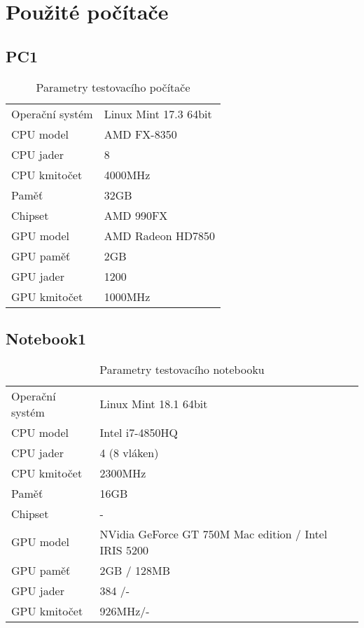 \section{Použité počítače}

\subsection{PC1}

\begin{table}[htbp]
\centering
\caption{Parametry testovacího počítače}
\begin{tabular}{|l|l|}
\hline
Operační systém&Linux Mint 17.3 64bit\\
CPU model&AMD FX-8350\\
CPU jader&8\\
CPU kmitočet& 4000MHz\\
Paměť& 32GB\\
Chipset&AMD 990FX\\
GPU model&AMD Radeon HD7850\\
GPU paměť&2GB\\
GPU jader&1200\\
GPU kmitočet& 1000MHz\\
\hline 
\end{tabular}
\end{table}

\subsection{Notebook1}


\begin{table}[htbp]
\centering
\caption{Parametry testovacího notebooku}
\begin{tabular}{|l|l|}
\hline
Operační systém&Linux Mint 18.1 64bit\\
CPU model&Intel i7-4850HQ\\
CPU jader&4 (8 vláken)\\
CPU kmitočet& 2300MHz\\
Paměť& 16GB\\
Chipset&-\\
GPU model&NVidia GeForce GT 750M Mac edition / Intel IRIS 5200\\
GPU paměť&2GB / 128MB\\
GPU jader&384 /-\\
GPU kmitočet& 926MHz/-\\
\hline 
\end{tabular}
\end{table}

